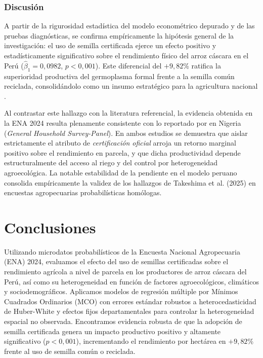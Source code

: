 \documentclass[11pt,a4paper,twocolumn]{article}
\begin{document}
\subsubsection{Discusión}
A partir de la rigurosidad estadística del modelo econométrico depurado y de las pruebas diagnósticas, se confirma empíricamente la hipótesis general de la investigación: el uso de semilla certificada ejerce un efecto positivo y estadísticamente significativo sobre el rendimiento físico del arroz cáscara en el Perú ($\hat{\beta}_1 = 0{,}0982$, $p < 0{,}001$). Este diferencial del $+9{,}82$\% ratifica la superioridad productiva del germoplasma formal frente a la semilla común reciclada, consolidándolo como un insumo estratégico para la agricultura nacional \citep{fao2019}.

Al contrastar este hallazgo con la literatura referencial, la evidencia obtenida en la ENA 2024 resulta plenamente consistente con lo reportado por \citet{takeshima2025} en Nigeria (\textit{General Household Survey-Panel}). En ambos estudios se demuestra que aislar estrictamente el atributo de \textit{certificación oficial} arroja un retorno marginal positivo sobre el rendimiento en parcela, y que dicha productividad depende estructuralmente del acceso al riego y del control por heterogeneidad agroecológica. La notable estabilidad de la pendiente en el modelo peruano consolida empíricamente la validez de los hallazgos de Takeshima et al. (2025) en encuestas agropecuarias probabilísticas homólogas.

\section{Conclusiones}
Utilizando microdatos probabilísticos de la Encuesta Nacional Agropecuaria (ENA) 2024, evaluamos el efecto del uso de semillas certificadas sobre el rendimiento agrícola a nivel de parcela en los productores de arroz cáscara del Perú, así como su heterogeneidad en función de factores agroecológicos, climáticos y sociodemográficos. Aplicamos modelos de regresión múltiple por Mínimos Cuadrados Ordinarios (MCO) con errores estándar robustos a heterocedasticidad de Huber-White y efectos fijos departamentales para controlar la heterogeneidad espacial no observada. Encontramos evidencia robusta de que la adopción de semilla certificada genera un impacto productivo positivo y altamente significativo ($p < 0{,}001$), incrementando el rendimiento por hectárea en $+9{,}82$\% frente al uso de semilla común o reciclada.
\end{document}
